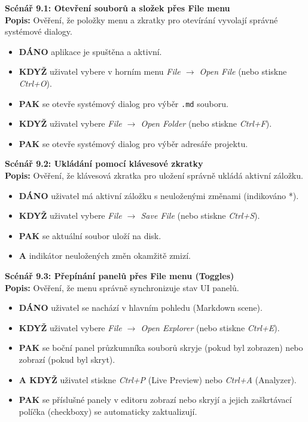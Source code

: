 \documentclass[12pt, a4paper]{article}
\begin{document}
\textbf{Scénář 9.1: Otevření souborů a složek přes File menu} \\
\textbf{Popis:} Ověření, že položky menu a zkratky pro otevírání vyvolají správné systémové dialogy.
\begin{itemize}
    \item \textbf{DÁNO} aplikace je spuštěna a aktivní.
    \item \textbf{KDYŽ} uživatel vybere v horním menu \textit{File $\rightarrow$ Open File} (nebo stiskne \textit{Ctrl+O}).
    \item \textbf{PAK} se otevře systémový dialog pro výběr \texttt{.md} souboru.
    \item \textbf{KDYŽ} uživatel vybere \textit{File $\rightarrow$ Open Folder} (nebo stiskne \textit{Ctrl+F}).
    \item \textbf{PAK} se otevře systémový dialog pro výběr adresáře projektu.
\end{itemize}

\textbf{Scénář 9.2: Ukládání pomocí klávesové zkratky} \\
\textbf{Popis:} Ověření, že klávesová zkratka pro uložení správně ukládá aktivní záložku.
\begin{itemize}
    \item \textbf{DÁNO} uživatel má aktivní záložku s neuloženými změnami (indikováno *).
    \item \textbf{KDYŽ} uživatel vybere \textit{File $\rightarrow$ Save File} (nebo stiskne \textit{Ctrl+S}).
    \item \textbf{PAK} se aktuální soubor uloží na disk.
    \item \textbf{A} indikátor neuložených změn okamžitě zmizí.
\end{itemize}

\textbf{Scénář 9.3: Přepínání panelů přes File menu (Toggles)} \\
\textbf{Popis:} Ověření, že menu správně synchronizuje stav UI panelů.
\begin{itemize}
    \item \textbf{DÁNO} uživatel se nachází v hlavním pohledu (Markdown scene).
    \item \textbf{KDYŽ} uživatel vybere \textit{File $\rightarrow$ Open Explorer} (nebo stiskne \textit{Ctrl+E}).
    \item \textbf{PAK} se boční panel průzkumníka souborů skryje (pokud byl zobrazen) nebo zobrazí (pokud byl skryt).
    \item \textbf{A KDYŽ} uživatel stiskne \textit{Ctrl+P} (Live Preview) nebo \textit{Ctrl+A} (Analyzer).
    \item \textbf{PAK} se příslušné panely v editoru zobrazí nebo skryjí a jejich zaškrtávací políčka (checkboxy) se automaticky zaktualizují.
\end{itemize}
\end{document}
